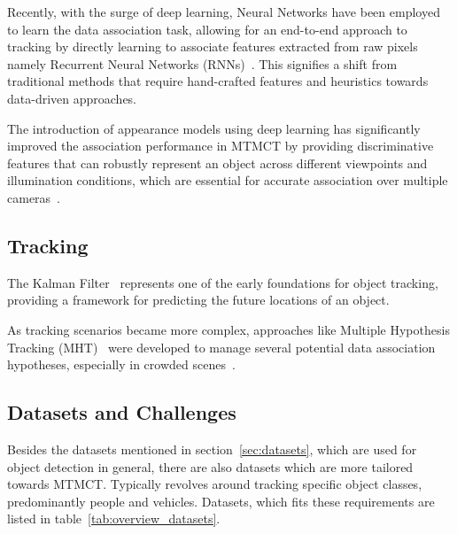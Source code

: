 Recently, with the surge of deep learning, Neural Networks have been employed to learn the data association task, allowing for an end-to-end approach to tracking by directly learning to associate features extracted from raw pixels namely Recurrent Neural Networks (RNNs)~\cite{Milan16b}. This signifies a shift from traditional methods that require hand-crafted features and heuristics towards data-driven approaches.

The introduction of appearance models using deep learning has significantly improved the association performance in MTMCT by providing discriminative features that can robustly represent an object across different viewpoints and illumination conditions, which are essential for accurate association over multiple cameras~\cite{Schroff15, Zheng16c}.

\subsection{Tracking}\label{subsec:milestone_tracking}
The Kalman Filter~\cite{Kalman60} represents one of the early foundations for object tracking, providing a framework for predicting the future locations of an object.

As tracking scenarios became more complex, approaches like Multiple Hypothesis Tracking (MHT)~\cite{Blackman04} were developed to manage several potential data association hypotheses, especially in crowded scenes~\cite{Reid79}.

\subsection{Datasets and Challenges}\label{subsec:datasets_and_challenges}
Besides the datasets mentioned in section~\ref{sec:datasets}, which are used for object detection in general, there are also datasets which are more tailored towards MTMCT. Typically revolves around tracking specific object classes, predominantly people and vehicles. Datasets, which fits these requirements are listed in table~\ref{tab:overview_datasets}.

